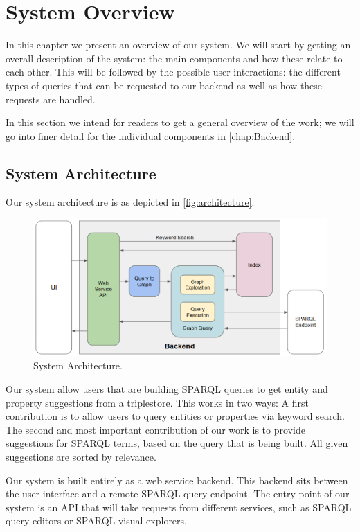 \chapter{System Overview}

In this chapter we present an overview of our system. 
We will start by getting an overall description of the system: 
the main components and how these relate to each other. 
This will be followed by the possible user interactions: 
the different types of queries that can be requested to our backend as well as how these requests are handled.

In this section we intend for readers to get a general overview of the work; we will go into finer detail for the individual components in \autoref{chap:Backend}.

\section{System Architecture}

Our system architecture is as depicted in \autoref{fig:architecture}.

\begin{figure}[H]
    \centering
        \includegraphics[width=\linewidth]{imagenes/architecture.png}
        \caption{System Architecture.}
        \label{fig:architecture}
\end{figure}

Our system allow users that are building SPARQL queries to get entity and property suggestions from a triplestore. 
This works in two ways: 
A first contribution is to allow users to query entities or properties via keyword search. 
The second and most important contribution of our work is to provide suggestions for SPARQL terms, based on the query that is being built. 
All given suggestions are sorted by relevance.

Our system is built entirely as a web service backend. 
This backend sits between the user interface and a remote SPARQL query endpoint. 
The entry point of our system is an API that will take requests from different services, such as SPARQL query editors or SPARQL visual explorers. 

